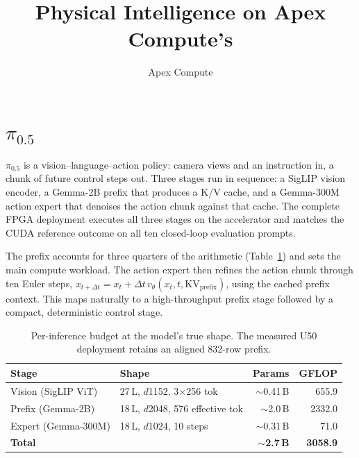 \documentclass[11pt]{article}
\title{\vspace{-2em}Physical Intelligence \pizero{} on Apex Compute's \ue{}}
\author{Apex Compute}
\date{\vspace{-1em}}
\newcommand{\pizero}{$\pi_{0.5}$}
\begin{document}
\maketitle

\section{\pizero{}}
\label{sec:model}
\pizero{} is a vision--language--action policy: camera views and an instruction
in, a chunk of future control steps out. Three stages run in sequence: a SigLIP
vision encoder, a Gemma-2B prefix that produces a K/V cache, and a Gemma-300M
action expert that denoises the action chunk against that cache.
The complete FPGA deployment executes all three stages on the accelerator and
matches the CUDA reference outcome on all ten closed-loop evaluation prompts.

The prefix accounts for three quarters of the arithmetic
(Table~\ref{tab:budget}) and sets the main compute workload. The action expert
then refines the action chunk through ten Euler steps,
$x_{t+\Delta t}=x_t+\Delta t\,v_\theta(x_t,t,\mathrm{KV}_{\text{prefix}})$,
using the cached prefix context. This maps naturally to a high-throughput
prefix stage followed by a compact, deterministic control stage.

\begin{table}[H]
\centering\small
\caption{Per-inference budget at the model's true shape. The measured U50
deployment retains an aligned 832-row prefix.}
\label{tab:budget}
\begin{tabular}{@{}llrr@{}}
\toprule
\textbf{Stage} & \textbf{Shape} & \textbf{Params} & \textbf{GFLOP} \\
\midrule
Vision (SigLIP ViT)  & 27\,L, $d$1152, 3$\times$256 tok & $\sim$0.41\,B & 655.9 \\
Prefix (Gemma-2B)    & 18\,L, $d$2048, 576 effective tok & $\sim$2.0\,B  & 2332.0 \\
Expert (Gemma-300M)  & 18\,L, $d$1024, 10 steps         & $\sim$0.31\,B & 71.0 \\
\midrule
\textbf{Total} & & \textbf{$\sim$2.7\,B} & \textbf{3058.9} \\
\bottomrule
\end{tabular}
\end{table}

\end{document}
